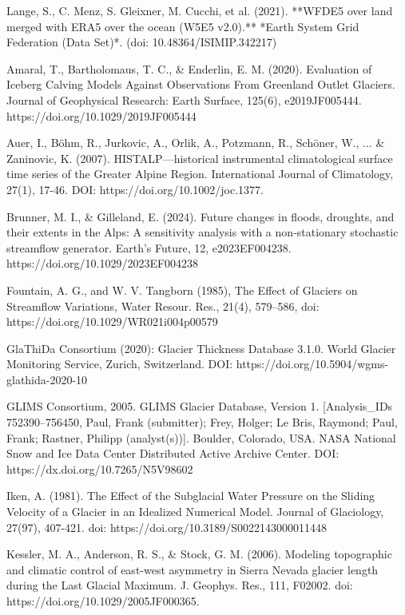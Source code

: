 \documentclass{article}
\begin{document}
\begin{thebibliography}{99}
     Lange, S., C. Menz, S. Gleixner, M. Cucchi, et al. (2021). **WFDE5 over land merged with ERA5 over the ocean (W5E5 v2.0).** *Earth System Grid Federation (Data Set)*. (doi: 10.48364/ISIMIP.342217)
   
    Amaral, T., Bartholomaus, T. C., \& Enderlin, E. M. (2020). Evaluation of Iceberg Calving Models Against Observations From Greenland Outlet Glaciers. Journal of Geophysical Research: Earth Surface, 125(6), e2019JF005444. https://doi.org/10.1029/2019JF005444 

    Auer, I., Böhm, R., Jurkovic, A., Orlik, A., Potzmann, R., Schöner, W., ... \& Zaninovic, K. (2007). HISTALP—historical instrumental climatological surface time series of the Greater Alpine Region. International Journal of Climatology, 27(1), 17-46. DOI: https://doi.org/10.1002/joc.1377. 

    Brunner, M. I., \& Gilleland, E. (2024). Future changes in floods, droughts, and their extents in the Alps: A sensitivity analysis with a non‐stationary stochastic streamflow generator. Earth's Future, 12, e2023EF004238. https://doi.org/10.1029/2023EF004238 

    Fountain, A. G., and W. V. Tangborn (1985), The Effect of Glaciers on Streamflow Variations, Water Resour. Res., 21(4), 579–586, doi: https://doi.org/10.1029/WR021i004p00579 

    GlaThiDa Consortium (2020): Glacier Thickness Database 3.1.0. World Glacier Monitoring Service, Zurich, Switzerland. DOI: https://doi.org/10.5904/wgms-glathida-2020-10 

    GLIMS Consortium, 2005. GLIMS Glacier Database, Version 1. [Analysis\_IDs 752390--756450, Paul, Frank (submitter); Frey, Holger; Le Bris, Raymond; Paul, Frank; Rastner, Philipp (analyst(s))]. Boulder, Colorado, USA. NASA National Snow and Ice Data Center Distributed Active Archive Center. DOI: https://dx.doi.org/10.7265/N5V98602 

    Iken, A. (1981). The Effect of the Subglacial Water Pressure on the Sliding Velocity of a Glacier in an Idealized Numerical Model. Journal of Glaciology, 27(97), 407-421. doi: https://doi.org/10.3189/S0022143000011448 

    Kessler, M. A., Anderson, R. S., \& Stock, G. M. (2006). Modeling topographic and climatic control of east-west asymmetry in Sierra Nevada glacier length during the Last Glacial Maximum. J. Geophys. Res., 111, F02002. doi: https://doi.org/10.1029/2005JF000365. 


\end{thebibliography}
\end{document}
